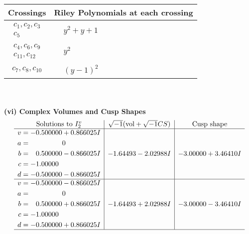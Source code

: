 \documentclass[1p]{elsarticle_modified}
\theoremstyle{definition}
\newcommand{\I}{\sqrt{-1}}
\begin{document}
\begin{tabular}{m{50pt}|m{274pt}}
Crossings & \hspace{64pt}Riley Polynomials at each crossing \\
\hline $$\begin{aligned}c_{1},c_{2},c_{3}\\c_{5}\end{aligned}$$&$\begin{aligned}
&y^2+y+1
\end{aligned}$\\
\hline $$\begin{aligned}c_{4},c_{6},c_{9}\\c_{11},c_{12}\end{aligned}$$&$\begin{aligned}
&y^2
\end{aligned}$\\
\hline $$\begin{aligned}c_{7},c_{8},c_{10}\end{aligned}$$&$\begin{aligned}
&(y-1)^2
\end{aligned}$\\
\hline
\end{tabular}\\~\\
\newpage\flushleft \textbf{(vi) Complex Volumes and Cusp Shapes}
$$\begin{array}{c|c|c}  
\text{Solutions to }I^v_{2}& \I (\text{vol} + \sqrt{-1}CS) & \text{Cusp shape}\\
 \hline 
\begin{aligned}
v &= -0.500000 + 0.866025 I \\
a &= \phantom{-0.000000 } 0 \\
b &= \phantom{-}0.500000 - 0.866025 I \\
c &= -1.00000\phantom{ +0.000000I} \\
d &= -0.500000 - 0.866025 I\end{aligned}
 & -1.64493 - 2.02988 I & -3.00000 + 3.46410 I \\ \hline\begin{aligned}
v &= -0.500000 - 0.866025 I \\
a &= \phantom{-0.000000 } 0 \\
b &= \phantom{-}0.500000 + 0.866025 I \\
c &= -1.00000\phantom{ +0.000000I} \\
d &= -0.500000 + 0.866025 I\end{aligned}
 & -1.64493 + 2.02988 I & -3.00000 - 3.46410 I\\
 \hline 
 \end{array}$$\newpage\newpage\renewcommand{\arraystretch}{1}
\end{document}
